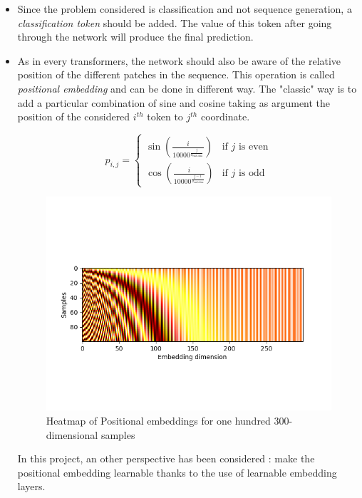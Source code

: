 \documentclass[twocolumn,superscriptaddress,aps]{revtex4-1}
\begin{document}
\begin{itemize}
    \item Since the problem considered is classification and not sequence generation, a \textit{classification token} should be added. The value of this token after going through the network will produce the final prediction. 
    \item As in every transformers, the network should also be aware of the relative position of the different patches in the sequence. This operation is called \textit{positional embedding} and  can be done in different way. The "classic" way is to add a particular combination of sine and cosine taking as argument the position of the considered $i^{th}$ token to $j^{th}$ coordinate. 

    
\[
p_{i,j} = 
\begin{cases} 
\sin \left( \frac{i}{10000^{\frac{j}{d_{\text{emb-dim}}}}} \right) & \text{if } j \text{ is even} \\
\cos \left( \frac{i}{10000^{\frac{j-1}{d_{\text{emb-dim}}}}} \right) & \text{if } j \text{ is odd}
\end{cases}
\]
    \begin{figure}[H]
        \centering
        \includegraphics[width=\linewidth]{images/positional_embeddings.png}
        \caption{Heatmap of Positional embeddings for one hundred 300-dimensional samples}
        \label{fig:pos_emb}
    \end{figure}
    
    In this project, an other perspective has been considered : make the positional embedding learnable thanks to the use of learnable embedding layers. 
\end{itemize}
\end{document}
